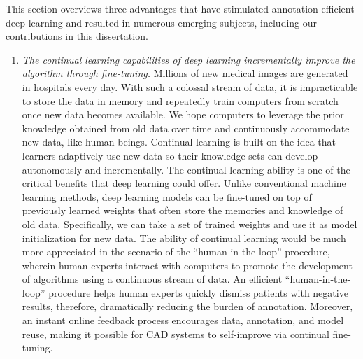 This section overviews three advantages that have stimulated annotation-efficient deep learning and resulted in numerous emerging subjects, including our contributions in this dissertation. 

\begin{enumerate}
    \item \textit{The continual learning capabilities of deep learning incrementally improve the algorithm through fine-tuning.} Millions of new medical images are generated in hospitals every day. With such a colossal stream of data, it is impracticable to store the data in memory and repeatedly train computers from scratch once new data becomes available. We hope computers to leverage the prior knowledge obtained from old data over time and continuously accommodate new data, like human beings. Continual learning is built on the idea that learners adaptively use new data so their knowledge sets can develop autonomously and incrementally. The continual learning ability is one of the critical benefits that deep learning could offer. Unlike conventional machine learning methods, deep learning models can be fine-tuned on top of previously learned weights that often store the memories and knowledge of old data. Specifically, we can take a set of trained weights and use it as model initialization for new data. The ability of continual learning would be much more appreciated in the scenario of the ``human-in-the-loop'' procedure, wherein human experts interact with computers to promote the development of algorithms using a continuous stream of data. An efficient ``human-in-the-loop'' procedure helps human experts quickly dismiss patients with negative results, therefore, dramatically reducing the burden of annotation. Moreover, an instant online feedback process encourages data, annotation, and model reuse, making it possible for CAD systems to self-improve via continual fine-tuning.
    

\end{enumerate}
